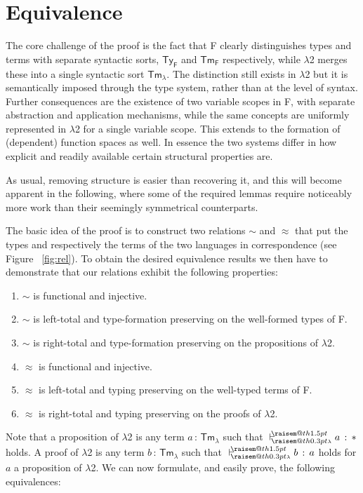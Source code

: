 \documentclass[a4paper,UKenglish]{lipics-v2016}
\makeatletter
\newcommand{\ms}{\,}
\newcommand{\mrel}[1]{\mathrel{\ms #1 \ms}}
\newcommand{\OF}{\mrel{:}}
\newcommand{\SysL}{$\lambda$2\xspace}
\newcommand{\TyF}{\ensuremath{\mathsf{Ty_{F}}}}
\newcommand{\TmF}{\ensuremath{\mathsf{Tm_{F}}}}
\newcommand{\TmL}{\ensuremath{\mathsf{Tm_{\lambda}}}}
\newcommand{\raisemath}[1]{\mathpalette{\raisem@th{#1}}}
\newcommand{\raisem@th}[3]{\raisebox{#1}{\ensuremath{#2#3}}}
\newcommand{\tsAnnot}[2]{\vdash\hspace{-.7em}^{\raisemath{1.5pt}{\scriptscriptstyle{#2}}}_{\raisemath{0.3pt}{\scriptscriptstyle{#1}}}} %
\newcommand{\tyL}{\tsAnnot{\lambda}{}} %
\newcommand{\typingL}[3]{\ensuremath{{#1} \mathrel{\tyL} #2 \OF #3}}
\newcommand{\tyr}{\mathrel{\sim}}
\newcommand{\tmr}{\mathrel{\approx}}
\newcommand{\Prp}{\ensuremath{\textrm{\textasteriskcentered}}}
\makeatother
\begin{document}
\section{Equivalence}
\label{sec:equi}

The core challenge of the proof is the fact that F clearly distinguishes types and terms with separate syntactic sorts, $\TyF$ and $\TmF$ respectively, while \SysL merges these into a single syntactic sort $\TmL$.
The distinction still exists in \SysL but it is semantically imposed through the type system, rather than at the level of syntax.
Further consequences are the existence of two variable scopes in F, with separate abstraction and application mechanisms, while the same concepts are uniformly represented in \SysL for a single variable scope.
This extends to the formation of (dependent) function spaces as well.
In essence the two systems differ in how explicit and readily available certain structural properties are.

As usual, removing structure is easier than recovering it, and this will become apparent in the following, where some of the required lemmas require noticeably more work than their seemingly symmetrical counterparts.

The basic idea of the proof is to construct two relations $\tyr$ and $\tmr$ that put the types and respectively the terms of the two languages in correspondence (see Figure ~\ref{fig:rel}).
%
To obtain the desired equivalence results we then have to demonstrate that our relations exhibit the following properties:
\begin{enumerate}
  \item $\tyr$ is functional and injective.
  \item $\tyr$ is left-total and type-formation preserving on the well-formed types of F.
  \item $\tyr$ is right-total and type-formation preserving on the propositions of \SysL.
  \item $\tmr$ is functional and injective.
  \item $\tmr$ is left-total and typing preserving on the well-typed terms of F.
  \item $\tmr$ is right-total and typing preserving on the proofs of \SysL.
\end{enumerate}
Note that a proposition of \SysL is any term $a \OF \TmL$ such that $\typingL{}{a}{\Prp}$ holds.
A proof of \SysL is any term $b \OF \TmL$ such that $\typingL{}{b}{a}$ holds for $a$ a proposition of \SysL.
We can now formulate, and easily prove, the following equivalences:
\end{document}
